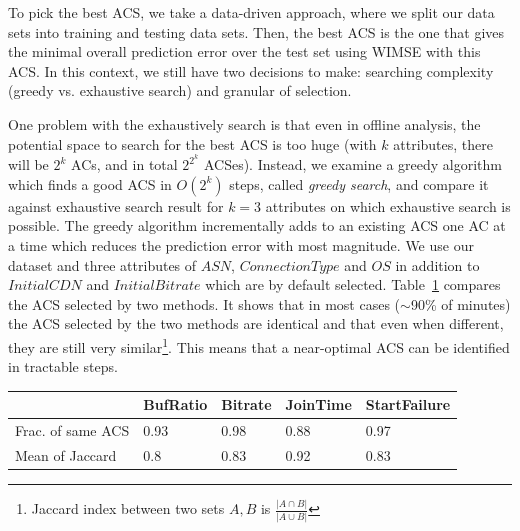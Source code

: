 To pick the best ACS, we take a data-driven approach, where we split our data sets into training and testing data sets. 
Then, the best ACS is the one that gives the minimal overall prediction error over the test set using WIMSE with this ACS. 
In this context, we still have two decisions to make: searching complexity (greedy vs. exhaustive search) and granular of selection.


 One problem with the exhaustively search is that even in offline analysis, the potential space to search for the best ACS is too huge (with $k$ attributes, there will be $2^k$ ACs, and in total $2^{2^k}$ ACSes). Instead, we examine a greedy algorithm which finds a good ACS in $O(2^k)$ steps, called {\it greedy search}, and compare it against exhaustive search result for $k=3$ attributes on which exhaustive search is possible. The greedy algorithm incrementally adds to an existing ACS one AC at a time which reduces the prediction error with most magnitude.
We use our dataset and three attributes of $ASN$, $ConnectionType$ and $OS$ in addition to $Initial CDN$ and $Initial Bitrate$ which are by default selected.
Table~\ref{tab:greedy-exhaustive} compares the ACS selected by two methods. It shows that in most cases ($\sim$90\% of minutes) the ACS selected by the two methods are identical and that even when different, they are still very similar\footnote{Jaccard index between two sets $A,B$ is $\frac{|A\cap B|}{|A\cup B|}$}. This means that a near-optimal ACS can be identified in tractable steps.

\begin{table}[t]
\begin{center}
\begin{small}
\begin{tabular}{p{2.2cm}|p{1.1cm}|p{1.1cm}|p{1.1cm}|p{1.1cm}}
		& BufRatio & Bitrate & JoinTime & StartFailure\\ \hline 
Frac. of same ACS & 0.93 & 0.98 & 0.88 & 0.97 \\
Mean of Jaccard & 0.8 & 0.83 & 0.92 & 0.83 \\
\end{tabular}
\end{small}
\end{center}
\label{tab:greedy-exhaustive}
\end{table}


